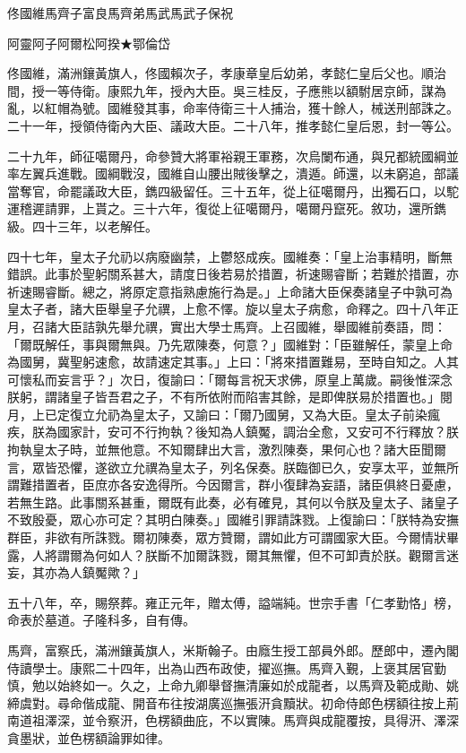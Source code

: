 
\begin{pinyinscope}
佟國維馬齊子富良馬齊弟馬武馬武子保祝

阿靈阿子阿爾松阿揆★鄂倫岱

佟國維，滿洲鑲黃旗人，佟國賴次子，孝康章皇后幼弟，孝懿仁皇后父也。順治間，授一等侍衛。康熙九年，授內大臣。吳三桂反，子應熊以額駙居京師，謀為亂，以紅帽為號。國維發其事，命率侍衛三十人捕治，獲十餘人，械送刑部誅之。二十一年，授領侍衛內大臣、議政大臣。二十八年，推孝懿仁皇后恩，封一等公。

二十九年，師征噶爾丹，命參贊大將軍裕親王軍務，次烏闌布通，與兄都統國綱並率左翼兵進戰。國綱戰沒，國維自山腰出賊後擊之，潰遁。師還，以未窮追，部議當奪官，命罷議政大臣，鐫四級留任。三十五年，從上征噶爾丹，出獨石口，以駝運稽遲請罪，上貰之。三十六年，復從上征噶爾丹，噶爾丹竄死。敘功，還所鐫級。四十三年，以老解任。

四十七年，皇太子允礽以病廢幽禁，上鬱怒成疾。國維奏：「皇上治事精明，斷無錯誤。此事於聖躬關系甚大，請度日後若易於措置，祈速賜睿斷；若難於措置，亦祈速賜睿斷。總之，將原定意指熟慮施行為是。」上命諸大臣保奏諸皇子中孰可為皇太子者，諸大臣舉皇子允禩，上愈不懌。旋以皇太子病愈，命釋之。四十八年正月，召諸大臣詰孰先舉允禩，實出大學士馬齊。上召國維，舉國維前奏語，問：「爾既解任，事與爾無與。乃先眾陳奏，何意？」國維對：「臣雖解任，蒙皇上命為國舅，冀聖躬速愈，故請速定其事。」上曰：「將來措置難易，至時自知之。人其可懷私而妄言乎？」次日，復諭曰：「爾每言祝天求佛，原皇上萬歲。嗣後惟深念朕躬，謂諸皇子皆吾君之子，不有所依附而陷害其餘，是即俾朕易於措置也。」閱月，上已定復立允礽為皇太子，又諭曰：「爾乃國舅，又為大臣。皇太子前染瘋疾，朕為國家計，安可不行拘執？後知為人鎮魘，調治全愈，又安可不行釋放？朕拘執皇太子時，並無他意。不知爾肆出大言，激烈陳奏，果何心也？諸大臣聞爾言，眾皆恐懼，遂欲立允禩為皇太子，列名保奏。朕臨御已久，安享太平，並無所謂難措置者，臣庶亦各安逸得所。今因爾言，群小復肆為妄語，諸臣俱終日憂慮，若無生路。此事關系甚重，爾既有此奏，必有確見，其何以令朕及皇太子、諸皇子不致殷憂，眾心亦可定？其明白陳奏。」國維引罪請誅戮。上復諭曰：「朕特為安撫群臣，非欲有所誅戮。爾初陳奏，眾方贊爾，謂如此方可謂國家大臣。今爾情狀畢露，人將謂爾為何如人？朕斷不加爾誅戮，爾其無懼，但不可卸責於朕。觀爾言迷妄，其亦為人鎮魘歟？」

五十八年，卒，賜祭葬。雍正元年，贈太傅，謚端純。世宗手書「仁孝勤恪」榜，命表於墓道。子隆科多，自有傳。

馬齊，富察氏，滿洲鑲黃旗人，米斯翰子。由廕生授工部員外郎。歷郎中，遷內閣侍讀學士。康熙二十四年，出為山西布政使，擢巡撫。馬齊入覲，上褒其居官勤慎，勉以始終如一。久之，上命九卿舉督撫清廉如於成龍者，以馬齊及範成勛、姚締虞對。尋命偕成龍、開音布往按湖廣巡撫張汧貪黷狀。初命侍郎色楞額往按上荊南道祖澤深，並令察汧，色楞額曲庇，不以實陳。馬齊與成龍覆按，具得汧、澤深貪墨狀，並色楞額論罪如律。


\end{pinyinscope}
